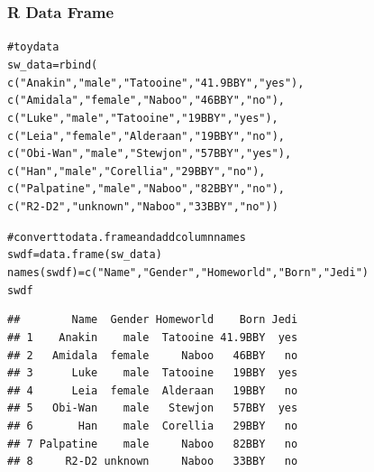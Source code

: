 \documentclass{beamer}\usepackage[]{graphicx}\usepackage[]{color}
\makeatletter
\newcommand{\hlstr}[1]{\textcolor[rgb]{0.063,0.58,0.627}{#1}}%
\newcommand{\hlcom}[1]{\textcolor[rgb]{0.588,0.588,0.588}{#1}}%
\newcommand{\hlstd}[1]{\textcolor[rgb]{0.196,0.196,0.196}{#1}}%
\newcommand{\hlkwb}[1]{\textcolor[rgb]{0.627,0,0.314}{#1}}%
\newcommand{\hlkwd}[1]{\textcolor[rgb]{0.78,0.227,0.412}{#1}}%
\newenvironment{kframe}{%
 \def\at@end@of@kframe{}%
 \ifinner\ifhmode%
  \def\at@end@of@kframe{\end{minipage}}%
  \begin{minipage}{\columnwidth}%
 \fi\fi%
 \def\FrameCommand##1{\hskip\@totalleftmargin \hskip-\fboxsep
 \colorbox{shadecolor}{##1}\hskip-\fboxsep
     \hskip-\linewidth \hskip-\@totalleftmargin \hskip\columnwidth}%
 \MakeFramed {\advance\hsize-\width
   \@totalleftmargin\z@ \linewidth\hsize
   \@setminipage}}%
 {\par\unskip\endMakeFramed%
 \at@end@of@kframe}
\newenvironment{knitrout}{}{} %
\makeatother
\begin{document}

\begin{frame}[fragile]
\frametitle{R Data Frame}

\begin{knitrout}\tiny
{}\color{fgcolor}\begin{kframe}
\begin{alltt}
\hlcom{# toy data}
\hlstd{sw_data} \hlkwb{=} \hlkwd{rbind}\hlstd{(}
  \hlkwd{c}\hlstd{(}\hlstr{"Anakin"}\hlstd{,} \hlstr{"male"}\hlstd{,} \hlstr{"Tatooine"}\hlstd{,} \hlstr{"41.9BBY"}\hlstd{,}  \hlstr{"yes"}\hlstd{),}
  \hlkwd{c}\hlstd{(}\hlstr{"Amidala"}\hlstd{,} \hlstr{"female"}\hlstd{,} \hlstr{"Naboo"}\hlstd{,} \hlstr{"46BBY"}\hlstd{,} \hlstr{"no"}\hlstd{),}
  \hlkwd{c}\hlstd{(}\hlstr{"Luke"}\hlstd{,} \hlstr{"male"}\hlstd{,} \hlstr{"Tatooine"}\hlstd{,} \hlstr{"19BBY"}\hlstd{,} \hlstr{"yes"}\hlstd{),}
  \hlkwd{c}\hlstd{(}\hlstr{"Leia"}\hlstd{,} \hlstr{"female"}\hlstd{,} \hlstr{"Alderaan"}\hlstd{,} \hlstr{"19BBY"}\hlstd{,} \hlstr{"no"}\hlstd{),}
  \hlkwd{c}\hlstd{(}\hlstr{"Obi-Wan"}\hlstd{,}  \hlstr{"male"}\hlstd{,} \hlstr{"Stewjon"}\hlstd{,} \hlstr{"57BBY"}\hlstd{,} \hlstr{"yes"}\hlstd{),}
  \hlkwd{c}\hlstd{(}\hlstr{"Han"}\hlstd{,} \hlstr{"male"}\hlstd{,} \hlstr{"Corellia"}\hlstd{,} \hlstr{"29BBY"}\hlstd{,} \hlstr{"no"}\hlstd{),}
  \hlkwd{c}\hlstd{(}\hlstr{"Palpatine"}\hlstd{,} \hlstr{"male"}\hlstd{,} \hlstr{"Naboo"}\hlstd{,} \hlstr{"82BBY"}\hlstd{,} \hlstr{"no"}\hlstd{),}
  \hlkwd{c}\hlstd{(}\hlstr{"R2-D2"}\hlstd{,} \hlstr{"unknown"}\hlstd{,} \hlstr{"Naboo"}\hlstd{,} \hlstr{"33BBY"}\hlstd{,} \hlstr{"no"}\hlstd{))}

\hlcom{# convert to data.frame and add column names}
\hlstd{swdf} \hlkwb{=} \hlkwd{data.frame}\hlstd{(sw_data)}
\hlkwd{names}\hlstd{(swdf)} \hlkwb{=} \hlkwd{c}\hlstd{(}\hlstr{"Name"}\hlstd{,} \hlstr{"Gender"}\hlstd{,} \hlstr{"Homeworld"}\hlstd{,} \hlstr{"Born"}\hlstd{,} \hlstr{"Jedi"}\hlstd{)}
\hlstd{swdf}
\end{alltt}
\begin{verbatim}
##        Name  Gender Homeworld    Born Jedi
## 1    Anakin    male  Tatooine 41.9BBY  yes
## 2   Amidala  female     Naboo   46BBY   no
## 3      Luke    male  Tatooine   19BBY  yes
## 4      Leia  female  Alderaan   19BBY   no
## 5   Obi-Wan    male   Stewjon   57BBY  yes
## 6       Han    male  Corellia   29BBY   no
## 7 Palpatine    male     Naboo   82BBY   no
## 8     R2-D2 unknown     Naboo   33BBY   no
\end{verbatim}
\end{kframe}
\end{knitrout}

\end{frame}
\end{document}
